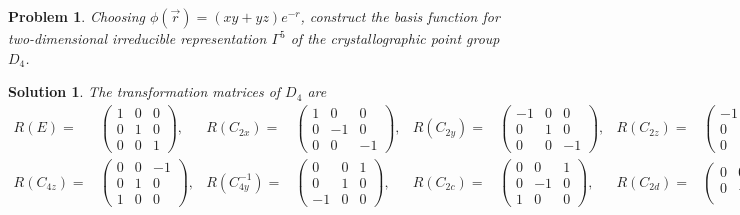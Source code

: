 \documentclass[UTF8,10pt,a4paper]{article}
\theoremstyle{Problem}
\newtheorem{prob}{Problem}
\theoremstyle{Solution}
\newtheorem*{sol}{Solution}
\begin{document}
\begin{prob}
    Choosing $\phi(\vec{r})=(xy+yz)e^{-r}$, construct the basis function for two-dimensional irreducible representation $\Gamma^5$ of the crystallographic point group $D_4$.
\end{prob}
\begin{sol}
    The transformation matrices of $D_4$ are
    \begin{align}
        R(E)=&\left(\begin{matrix}
            1&0&0\\
            0&1&0\\
            0&0&1
        \end{matrix}\right),&R(C_{2x})=&\left(\begin{matrix}
            1&0&0\\
            0&-1&0\\
            0&0&-1
        \end{matrix}\right),&R(C_{2y})=&\left(\begin{matrix}
            -1&0&0\\
            0&1&0\\
            0&0&-1
        \end{matrix}\right),&R(C_{2z})=&\left(\begin{matrix}
            -1&0&0\\
            0&-1&0\\
            0&0&1
        \end{matrix}\right),\\
        R(C_{4z})=&\left(\begin{matrix}
            0&0&-1\\
            0&1&0\\
            1&0&0
        \end{matrix}\right),&R(C_{4y}^{-1})=&\left(\begin{matrix}
            0&0&1\\
            0&1&0\\
            -1&0&0
        \end{matrix}\right),&R(C_{2c})=&\left(\begin{matrix}
            0&0&1\\
            0&-1&0\\
            1&0&0
        \end{matrix}\right),&R(C_{2d})=&\left(\begin{matrix}
            0&0&-1\\
            0&-1&0\\

\end{matrix}
\end{align}
\end{sol}
\end{document}
